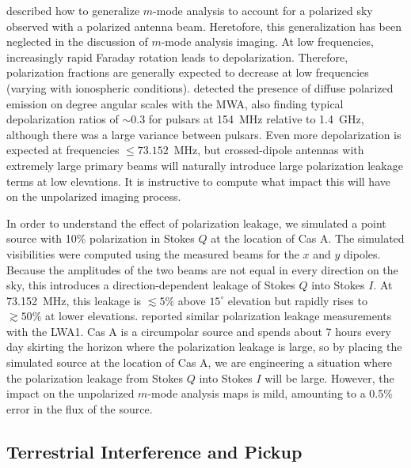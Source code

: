 \documentclass[twocolumn]{aastex61}
\begin{document}
\citet{2015PhRvD..91h3514S} described how to generalize $m$-mode analysis to account for a polarized
sky observed with a polarized antenna beam. Heretofore, this generalization has been neglected in the
discussion of $m$-mode analysis imaging.  At low frequencies, increasingly rapid Faraday rotation
leads to depolarization. Therefore, polarization fractions are generally expected to decrease at low
frequencies (varying with ionospheric conditions). \citet{2016ApJ...830...38L} detected the presence
of diffuse polarized emission on degree angular scales with the MWA, also finding typical
depolarization ratios of $\sim0.3$ for pulsars at 154~MHz relative to 1.4~GHz, although there was a
large variance between pulsars. Even more depolarization is expected at frequencies $\le
73.152$~MHz, but crossed-dipole antennas with extremely large primary beams will naturally introduce
large polarization leakage terms at low elevations.  It is instructive to compute what impact this
will have on the unpolarized imaging process.

In order to understand the effect of polarization leakage, we simulated a point source with 10\%
polarization in Stokes $Q$ at the location of Cas A.  The simulated visibilities were computed using
the measured beams for the $x$ and $y$ dipoles. Because the amplitudes of the two beams are not equal in
every direction on the sky, this introduces a direction-dependent leakage of Stokes $Q$ into
Stokes $I$. At 73.152~MHz, this leakage is $\lesssim5\%$ above $15^\circ$ elevation but rapidly
rises to $\gtrsim50\%$ at lower elevations. \citet{2015JAI.....450004O} reported similar polarization
leakage measurements with the LWA1.  Cas A is a circumpolar source and spends about 7 hours
every day skirting the horizon where the polarization leakage is large, so by placing the simulated
source at the location of Cas A, we are engineering a situation where the polarization leakage from
Stokes $Q$ into Stokes $I$ will be large. However, the impact on the unpolarized $m$-mode analysis
maps is mild, amounting to a 0.5\% error in the flux of the source.

\subsection{Terrestrial Interference and Pickup}\label{sec:rfi}
\end{document}

